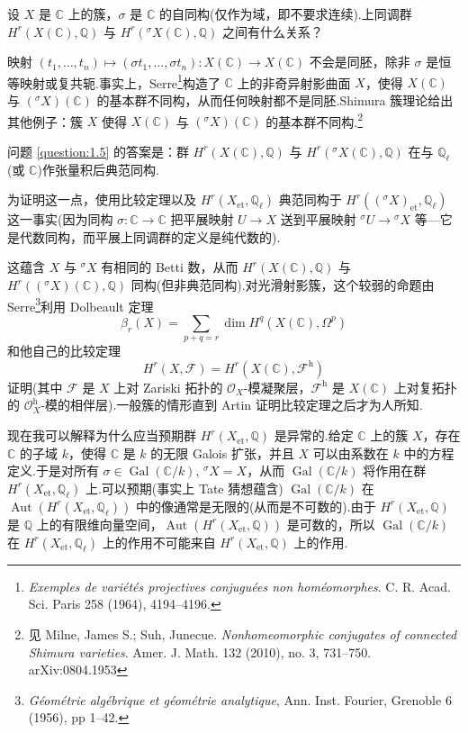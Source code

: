 \begin{question}\label{question:1.5}
设 $X$ 是 $\mathbb{C}$ 上的簇，$\sigma$ 是 $\mathbb{C}$ 的自同构(仅作为域，即不要求连续).上同调群 $H^{r}(X(\mathbb{C}), \mathbb{Q})$ 与 $H^{r}({}^{\sigma}X(\mathbb{C}), \mathbb{Q})$ 之间有什么关系？
\end{question}

映射 $(t_1, \ldots, t_n) \mapsto (\sigma t_1, \ldots, \sigma t_n) \colon X(\mathbb{C}) \to X(\mathbb{C})$ 不会是同胚，除非 $\sigma$ 是恒等映射或复共轭.事实上，Serre\footnote{\emph{Exemples de vari\'et\'es projectives conjugu\'ees non hom\'eomorphes}. C. R. Acad. Sci. Paris 258 (1964), 4194--4196.}构造了 $\mathbb{C}$ 上的非奇异射影曲面 $X$，使得 $X(\mathbb{C})$ 与 $({}^{\sigma}X)(\mathbb{C})$ 的基本群不同构，从而任何映射都不是同胚.Shimura 簇理论给出其他例子：簇 $X$ 使得 $X(\mathbb{C})$ 与 $({}^{\sigma}X)(\mathbb{C})$ 的基本群不同构.\footnote{见 Milne, James S.; Suh, Junecue. \emph{Nonhomeomorphic conjugates of connected Shimura varieties}. Amer. J. Math. 132 (2010), no. 3, 731--750. arXiv:0804.1953}

问题 \ref{question:1.5} 的答案是：群 $H^{r}(X(\mathbb{C}), \mathbb{Q})$ 与 $H^{r}({}^{\sigma}X(\mathbb{C}), \mathbb{Q})$ 在与 $\mathbb{Q}_{\ell}$(或 $\mathbb{C}$)作张量积后典范同构.

为证明这一点，使用比较定理以及 $H^{r}(X_{\mathrm{et}}, \mathbb{Q}_{\ell})$ 典范同构于 $H^{r}(({}^{\sigma}X)_{\mathrm{et}}, \mathbb{Q}_{\ell})$ 这一事实(因为同构 $\sigma \colon \mathbb{C} \to \mathbb{C}$ 把平展映射 $U \to X$ 送到平展映射 $^{\sigma}U \to {}^{\sigma}X$ 等---它是代数同构，而平展上同调群的定义是纯代数的).

这蕴含 $X$ 与 $^{\sigma}X$ 有相同的 Betti 数，从而 $H^{r}(X(\mathbb{C}), \mathbb{Q})$ 与 $H^{r}(({}^{\sigma}X)(\mathbb{C}), \mathbb{Q})$ 同构(但非典范同构).对光滑射影簇，这个较弱的命题由 Serre\footnote{\emph{G\'eom\'etrie alg\'ebrique et g\'eom\'etrie analytique}, Ann. Inst. Fourier, Grenoble 6 (1956), pp 1--42.}利用 Dolbeault 定理
\[
\beta_r(X) = \sum_{p+q=r} \dim H^{q}(X(\mathbb{C}), \Omega^{p})
\]
和他自己的比较定理
\[
H^{r}(X, \mathcal{F}) = H^{r}(X(\mathbb{C}), \mathcal{F}^{\mathrm{h}})
\]
证明(其中 $\mathcal{F}$ 是 $X$ 上对 Zariski 拓扑的 $\mathcal{O}_X$-模凝聚层，$\mathcal{F}^{\mathrm{h}}$ 是 $X(\mathbb{C})$ 上对复拓扑的 $\mathcal{O}^{\mathrm{h}}_{X}$-模的相伴层).一般簇的情形直到 Artin 证明比较定理之后才为人所知.

现在我可以解释为什么应当预期群 $H^{r}(X_{\mathrm{et}}, \mathbb{Q})$ 是异常的.给定 $\mathbb{C}$ 上的簇 $X$，存在 $\mathbb{C}$ 的子域 $k$，使得 $\mathbb{C}$ 是 $k$ 的无限 Galois 扩张，并且 $X$ 可以由系数在 $k$ 中的方程定义.于是对所有 $\sigma \in \operatorname{Gal}(\mathbb{C}/k)$, $^{\sigma}X = X$，从而 $\operatorname{Gal}(\mathbb{C}/k)$ 将作用在群 $H^{r}(X_{\mathrm{et}}, \mathbb{Q}_{\ell})$ 上.可以预期(事实上 Tate 猜想蕴含) $\operatorname{Gal}(\mathbb{C}/k)$ 在 $\operatorname{Aut}(H^{r}(X_{\mathrm{et}}, \mathbb{Q}_{\ell}))$ 中的像通常是无限的(从而是不可数的).由于 $H^{r}(X_{\mathrm{et}}, \mathbb{Q})$ 是 $\mathbb{Q}$ 上的有限维向量空间，$\operatorname{Aut}(H^{r}(X_{\mathrm{et}}, \mathbb{Q}))$ 是可数的，所以 $\operatorname{Gal}(\mathbb{C}/k)$ 在 $H^{r}(X_{\mathrm{et}}, \mathbb{Q}_{\ell})$ 上的作用不可能来自 $H^{r}(X_{\mathrm{et}}, \mathbb{Q})$ 上的作用.

